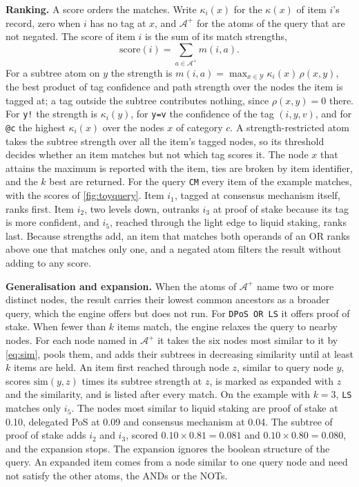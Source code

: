 \textbf{Ranking.} A score orders the matches. Write $\kappa_i(x)$ for the
$\kappa(x)$ of item $i$'s record, zero when $i$ has no tag at $x$, and
$\mathcal{A}^{+}$ for the atoms of the query that are not negated. The score
of item $i$ is the sum of its match strengths,
\begin{equation}
  \label{eq:score}
  \mathrm{score}(i) = \sum_{a \in \mathcal{A}^{+}} m(i, a).
\end{equation}
For a subtree atom on $y$ the strength is
$m(i, a) = \max_{x \in \mathcal{Y}} \kappa_i(x)\, \rho(x, y)$, the best
product of tag confidence and path strength over the nodes the item is
tagged at; a tag outside the subtree contributes nothing, since
$\rho(x, y) = 0$ there. For \texttt{y!} the strength is $\kappa_i(y)$, for
\texttt{y=v} the confidence of the tag $(i, y, v)$, and for \texttt{@c} the
highest $\kappa_i(x)$ over the nodes $x$ of category $c$. A
strength-restricted atom takes the subtree strength over all the item's
tagged nodes, so its threshold decides whether an item matches but not which
tag scores it. The node $x$ that attains the maximum is reported with the
item, ties are broken by item identifier, and the $k$ best are returned. For
the query \texttt{CM} every item of the example matches, with the scores of
\cref{fig:toyquery}. Item $i_1$, tagged at consensus mechanism itself, ranks
first. Item $i_2$, two levels down, outranks $i_3$ at proof of stake because
its tag is more confident, and $i_5$, reached through the light edge to
liquid staking, ranks last. Because strengths add, an item that matches both
operands of an OR ranks above one that matches only one, and a negated atom
filters the result without adding to any score.

\textbf{Generalisation and expansion.} When the atoms of $\mathcal{A}^{+}$
name two or more distinct nodes, the result carries their lowest common
ancestors as a broader query, which the engine offers but does not run. For
\texttt{DPoS OR LS} it offers proof of stake. When fewer than $k$ items
match, the engine relaxes the query to nearby nodes. For each node named in
$\mathcal{A}^{+}$ it takes the six nodes most similar to it by
\cref{eq:sim}, pools them, and adds their subtrees in decreasing similarity
until at least $k$ items are held. An item first reached through node $z$,
similar to query node $y$, scores $\mathrm{sim}(y, z)$ times its subtree
strength at $z$, is marked as expanded with $z$ and the similarity, and is
listed after every match. On the example with $k = 3$, \texttt{LS} matches
only $i_5$. The nodes most similar to liquid staking are proof of stake at
0.10, delegated PoS at 0.09 and consensus mechanism at 0.04. The subtree of
proof of stake adds $i_2$ and $i_3$, scored $0.10 \times 0.81 = 0.081$ and
$0.10 \times 0.80 = 0.080$, and the expansion stops. The expansion ignores
the boolean structure of the query. An expanded item comes from a node
similar to one query node and need not satisfy the other atoms, the ANDs or
the NOTs.

